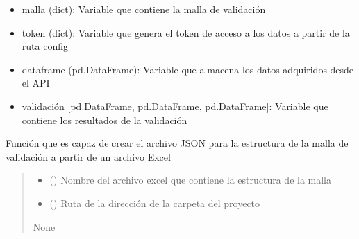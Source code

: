 \documentclass[letterpaper,10pt,spanish]{sphinxmanual}
\begin{document}
\begin{fulllineitems}
\begin{description}
\begin{itemize}
\item {} 
\sphinxAtStartPar
malla (dict): Variable que contiene la malla de validación

\item {} 
\sphinxAtStartPar
token (dict): Variable que genera el token de acceso a los datos a partir de la ruta config

\item {} 
\sphinxAtStartPar
dataframe (pd.DataFrame): Variable que almacena los datos adquiridos desde el API

\item {} 
\sphinxAtStartPar
validación {[}pd.DataFrame, pd.DataFrame, pd.DataFrame{]}: Variable que contiene los resultados de la validación

\end{itemize}

\end{description}

\end{fulllineitems}

\begin{quote}\begin{description}
\end{description}\end{quote}

\begin{fulllineitems}
\label{\detokenize{index:malla_functions.create_json_malla}}
\pysigstartsignatures
{}
\pysigstopsignatures
\sphinxAtStartPar
Función que es capaz de crear el archivo JSON para la estructura de la malla de validación a partir de un archivo Excel
\begin{quote}\begin{description}
\begin{itemize}
\item {} 
\sphinxAtStartPar
{} () \textendash{} Nombre del archivo excel que contiene la estructura de la malla

\item {} 
\sphinxAtStartPar
{} () \textendash{} Ruta de la dirección de la carpeta del proyecto

\end{itemize}

\sphinxAtStartPar
None

\end{description}\end{quote}

\end{fulllineitems}
\end{document}
